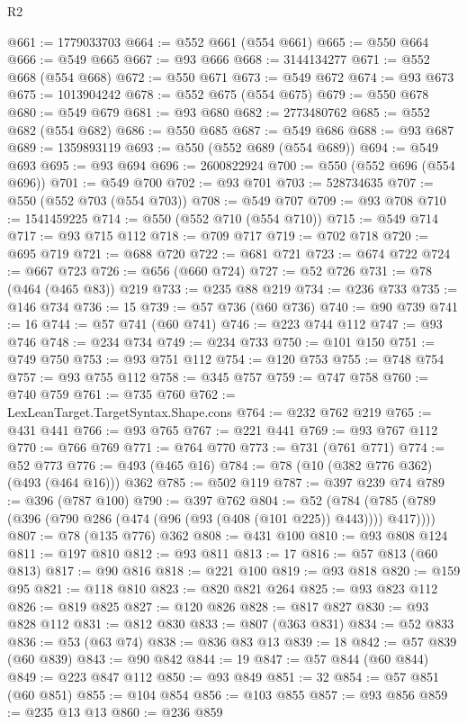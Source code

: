 \begin{lexlean}{R2}
\begin{coremodule}
@661 := 1779033703
@664 := @552 @661 (@554 @661)
@665 := @550 @664
@666 := @549 @665
@667 := @93 @666
@668 := 3144134277
@671 := @552 @668 (@554 @668)
@672 := @550 @671
@673 := @549 @672
@674 := @93 @673
@675 := 1013904242
@678 := @552 @675 (@554 @675)
@679 := @550 @678
@680 := @549 @679
@681 := @93 @680
@682 := 2773480762
@685 := @552 @682 (@554 @682)
@686 := @550 @685
@687 := @549 @686
@688 := @93 @687
@689 := 1359893119
@693 := @550 (@552 @689 (@554 @689))
@694 := @549 @693
@695 := @93 @694
@696 := 2600822924
@700 := @550 (@552 @696 (@554 @696))
@701 := @549 @700
@702 := @93 @701
@703 := 528734635
@707 := @550 (@552 @703 (@554 @703))
@708 := @549 @707
@709 := @93 @708
@710 := 1541459225
@714 := @550 (@552 @710 (@554 @710))
@715 := @549 @714
@717 := @93 @715 @112
@718 := @709 @717
@719 := @702 @718
@720 := @695 @719
@721 := @688 @720
@722 := @681 @721
@723 := @674 @722
@724 := @667 @723
@726 := @656 (@660 @724)
@727 := @52 @726
@731 := @78 (@464 (@465 @83)) @219
@733 := @235 @88 @219
@734 := @236 @733
@735 := @146 @734
@736 := 15
@739 := @57 @736 (@60 @736)
@740 := @90 @739
@741 := 16
@744 := @57 @741 (@60 @741)
@746 := @223 @744 @112
@747 := @93 @746
@748 := @234 @734
@749 := @234 @733
@750 := @101 @150
@751 := @749 @750
@753 := @93 @751 @112
@754 := @120 @753
@755 := @748 @754
@757 := @93 @755 @112
@758 := @345 @757
@759 := @747 @758
@760 := @740 @759
@761 := @735 @760
@762 := LexLeanTarget.TargetSyntax.Shape.cons
@764 := @232 @762 @219
@765 := @431 @441
@766 := @93 @765
@767 := @221 @441
@769 := @93 @767 @112
@770 := @766 @769
@771 := @764 @770
@773 := @731 (@761 @771)
@774 := @52 @773
@776 := @493 (@465 @16)
@784 := @78 (@10 (@382 @776 @362) (@493 (@464 @16))) @362
@785 := @502 @119
@787 := @397 @239 @74
@789 := @396 (@787 @100)
@790 := @397 @762
@804 := @52 (@784 (@785 (@789 (@396 (@790 @286 (@474 (@96 (@93 (@408 (@101 @225)) @443)))) @417))))
@807 := @78 (@135 @776) @362
@808 := @431 @100
@810 := @93 @808 @124
@811 := @197 @810
@812 := @93 @811
@813 := 17
@816 := @57 @813 (@60 @813)
@817 := @90 @816
@818 := @221 @100
@819 := @93 @818
@820 := @159 @95
@821 := @118 @810
@823 := @820 @821 @264
@825 := @93 @823 @112
@826 := @819 @825
@827 := @120 @826
@828 := @817 @827
@830 := @93 @828 @112
@831 := @812 @830
@833 := @807 (@363 @831)
@834 := @52 @833
@836 := @53 (@63 @74)
@838 := @836 @83 @13
@839 := 18
@842 := @57 @839 (@60 @839)
@843 := @90 @842
@844 := 19
@847 := @57 @844 (@60 @844)
@849 := @223 @847 @112
@850 := @93 @849
@851 := 32
@854 := @57 @851 (@60 @851)
@855 := @104 @854
@856 := @103 @855
@857 := @93 @856
@859 := @235 @13 @13
@860 := @236 @859

\end{coremodule}
\end{lexlean}
